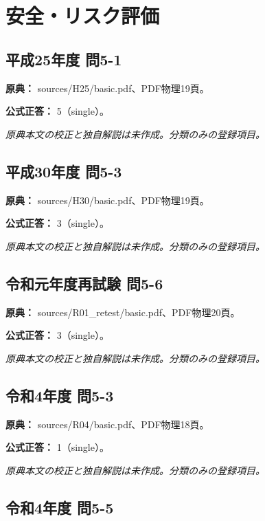 \section{安全・リスク評価}

\subsection{平成25年度 問5-1}
\label{q:h25-reg-basic-5-1}

\noindent\textbf{原典：} sources/H25/basic.pdf、PDF物理19頁。

\textbf{公式正答：} 5（single）。

\par\textit{原典本文の校正と独自解説は未作成。分類のみの登録項目。}

\subsection{平成30年度 問5-3}
\label{q:h30-reg-basic-5-3}

\noindent\textbf{原典：} sources/H30/basic.pdf、PDF物理19頁。

\textbf{公式正答：} 3（single）。

\par\textit{原典本文の校正と独自解説は未作成。分類のみの登録項目。}

\subsection{令和元年度再試験 問5-6}
\label{q:r01-ret-basic-5-6}

\noindent\textbf{原典：} sources/R01\_retest/basic.pdf、PDF物理20頁。

\textbf{公式正答：} 3（single）。

\par\textit{原典本文の校正と独自解説は未作成。分類のみの登録項目。}

\subsection{令和4年度 問5-3}
\label{q:r04-reg-basic-5-3}

\noindent\textbf{原典：} sources/R04/basic.pdf、PDF物理18頁。

\textbf{公式正答：} 1（single）。

\par\textit{原典本文の校正と独自解説は未作成。分類のみの登録項目。}

\subsection{令和4年度 問5-5}
\label{q:r04-reg-basic-5-5}

